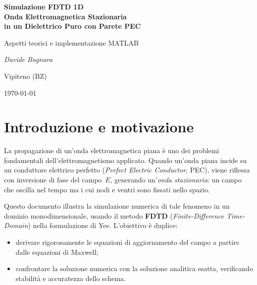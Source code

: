 \documentclass[a4paper, 11pt]{article}
\begin{document}
\begin{titlepage}
    \centering
    \vspace*{2cm}
    {\LARGE\bfseries Simulazione FDTD 1D\\[0.4em]
    Onda Elettromagnetica Stazionaria\\[0.2em]
    in un Dielettrico Puro con Parete PEC\par}
    \vspace{1.5cm}
    {\large Aspetti teorici e implementazione MATLAB\par}
    \vspace{2cm}
    {\large\itshape Davide Bagnara\par}
    \vspace{0.5em}
    {\normalsize Vipiteno (BZ)\par}
    \vfill
    {\normalsize \today\par}
\end{titlepage}

\tableofcontents
\newpage

\section{Introduzione e motivazione}

La propagazione di un'onda elettromagnetica piana è uno dei problemi fondamentali
dell'elettromagnetismo applicato. Quando un'onda piana incide su un conduttore
elettrico perfetto (\emph{Perfect Electric Conductor}, PEC), viene riflessa con
inversione di fase del campo~$E$, generando un'\emph{onda stazionaria}: un campo
che oscilla nel tempo ma i cui nodi e ventri sono fissati nello spazio.

Questo documento illustra la simulazione numerica di tale fenomeno in un dominio
monodimensionale, usando il metodo \textbf{FDTD} (\emph{Finite-Difference Time-Domain})
nella formulazione di Yee. L'obiettivo è duplice:
\begin{itemize}
    \item derivare rigorosamente le equazioni di aggiornamento del campo a partire
          dalle equazioni di Maxwell;
    \item confrontare la soluzione numerica con la soluzione analitica esatta,
          verificando stabilità e accuratezza dello schema.
\end{itemize}
\end{document}
